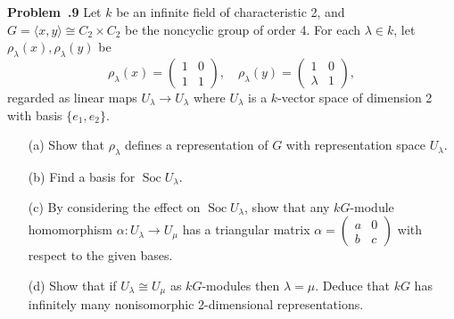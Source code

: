 \documentclass[12pt]{article}
\DeclareMathOperator{\Soc}{Soc}
\newenvironment{prob}[1]{\par\smallskip
	\noindent\begin{mdframed}\small \textbf{Problem~\thesection.#1} \rmfamily\quad}{\end{mdframed}\medskip}
\begin{document}
\begin{prob}{9}
	Let $k$ be an infinite field of characteristic 2, and $G=\langle x,y\rangle\cong C_2\times C_2$ be the noncyclic group of order 4. For each $\lambda\in k$, let $\rho_\lambda(x),\rho_\lambda(y)$ be
	\[\rho_\lambda(x)=\begin{pmatrix}1&0\\1&1\end{pmatrix},\quad\rho_\lambda(y)=\begin{pmatrix}1&0\\\lambda & 1\end{pmatrix},\]
	regarded as linear maps $U_\lambda\to U_\lambda$ where $U_\lambda$ is a $k$-vector space of dimension 2 with basis $\{e_1,e_2\}.$
	\begin{itemize}
		\item[(a)] Show that $\rho_\lambda$ defines a representation of $G$ with representation space $U_\lambda$.
		\item[(b)] Find a basis for $\Soc U_\lambda$.
		\item[(c)] By considering the effect on $\Soc U_\lambda$, show that any $kG$-module homomorphism $\alpha:U_\lambda\to U_\mu$ has a triangular matrix $\alpha=(\begin{smallmatrix}a&0\\b&c\end{smallmatrix})$ with respect to the given bases.
		\item[(d)] Show that if $U_\lambda\cong U_\mu$ as $kG$-modules then $\lambda=\mu$. Deduce that $kG$ has infinitely many nonisomorphic 2-dimensional representations.
	\end{itemize}
\end{prob}
\end{document}

